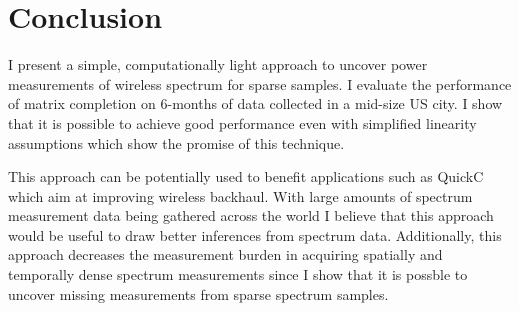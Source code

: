 
\section{Conclusion}

I present a simple, computationally light approach to uncover power measurements of wireless spectrum for sparse samples.
 I evaluate the performance of matrix completion on 6-months of data collected in a mid-size US city.
 I show that it is possible to achieve good performance even with simplified linearity assumptions which show the promise of this technique.


This approach can be potentially used to benefit applications such as QuickC \cite{QuickC} which aim at improving wireless backhaul.
 With large amounts of spectrum measurement data being gathered across the world \cite{SpectrumForCogRadio1} \cite{ChicagoSpectrum} \cite{ChicagoSpectrum2} \cite{SpectrumDynamics} I believe that this approach would be useful to draw better inferences from spectrum data.
 Additionally, this approach decreases the measurement burden in acquiring spatially and temporally dense spectrum measurements since I show that it is possble to uncover missing measurements from sparse spectrum samples.

